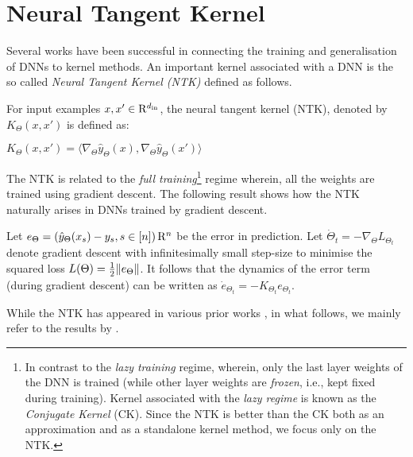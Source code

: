 \section{Neural Tangent Kernel}
Several works \cite{ntk,fcgp,convgp,arora2019exact,arora} have been successful in connecting the training and generalisation of DNNs to kernel methods. An important kernel associated with a DNN is the so called \emph{Neural Tangent Kernel (NTK)} defined as follows.
\begin{definition}\label{def:ntk}
 For input examples $x,x'\in\mathrm{R}^{d_{\text{in}}}$, the neural tangent kernel (NTK), denoted by $K_{\Theta}(x,x')$ is defined as:
\centerline{$
K_{\Theta}(x,x') = \langle\nabla_{\Theta} \hat{y}_{\Theta}(x), \nabla_{\Theta} \hat{y}_{\Theta}(x') \rangle
$}
\end{definition}
The NTK is related to the \emph{full training}\footnote{In contrast to the \emph{lazy training} regime, wherein, only the last layer weights of the DNN is trained (while other layer weights are \emph{frozen}, i.e., kept fixed during training). Kernel associated with the \emph{lazy regime} is known as the \emph{Conjugate Kernel} (CK). Since the NTK  \cite{arora2019exact} is better than the CK \cite{convgp} both as an approximation and as a standalone kernel method, we focus only on the NTK.}  regime wherein, all the weights are trained using gradient descent. The following result shows how the NTK naturally arises in DNNs trained by gradient descent.
\begin{proposition}\label{prop:basic}
Let $e_{\Theta}=\left(\hat{y}_{\Theta}(x_s)-y_s,s\in[n]\right)\mathrm{R}^n$ be the error in prediction. Let $\dot{\Theta}_t=-\nabla_{\Theta}L_{\Theta_t}$ denote gradient descent  with infinitesimally small step-size to minimise the  squared loss $L(\Theta)=\frac{1}{2}\|e_{\Theta}\|$. It follows that the dynamics of the error term (during gradient descent) can be written as $\dot{e}_{\Theta_t}=-K_{\Theta_t} e_{\Theta_t}$. 
\end{proposition}
While the NTK has appeared in various prior works \cite{ntk,dudnn,arora2019exact,cao2019generalization}, in what follows, we mainly refer to the results by \citet{arora2019exact}. 

